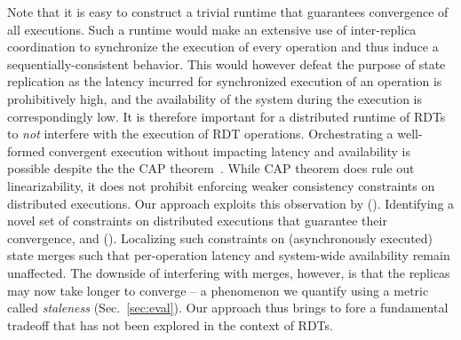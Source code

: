 Note that it is easy to construct a trivial runtime that guarantees
convergence of all executions. Such a runtime would make an extensive
use of inter-replica coordination to synchronize the execution of
every operation and thus induce a sequentially-consistent behavior.
This would however defeat the purpose of state replication as the
latency incurred for synchronized execution of an operation is
prohibitively high, and the availability of the system during the
execution is correspondingly low. It is therefore important for a
distributed runtime of RDTs to \emph{not} interfere with the execution
of RDT operations. Orchestrating a well-formed convergent execution
without impacting latency and availability is possible despite the the
CAP theorem~\cite{cap}. While CAP theorem does rule out
linearizability, it does not prohibit enforcing weaker consistency
constraints on distributed executions. Our approach exploits this
observation by ().  Identifying a novel set of constraints on
distributed executions that guarantee their convergence, and
(). Localizing such constraints on (asynchronously executed)
state merges such that per-operation latency and system-wide
availability remain unaffected. The downside of interfering with
merges, however, is that the replicas may now take longer to converge
-- a phenomenon we quantify using a metric called \emph{staleness}
(Sec.~\ref{sec:eval}). Our approach thus brings to fore a fundamental
tradeoff that has not been explored in the context of RDTs.

